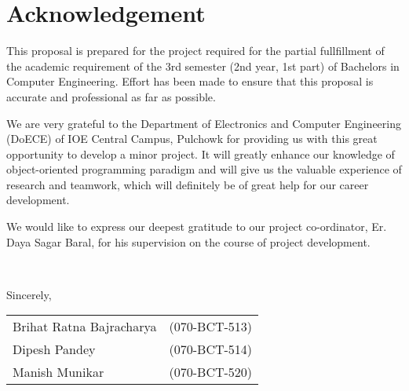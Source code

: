 \section*{Acknowledgement}

This proposal is prepared for the project required for the partial fullfillment
of the academic requirement of the 3rd semester (2nd year, 1st part) of
Bachelors in Computer Engineering. Effort has been made to ensure that this
proposal is accurate and professional as far as possible.

We are very grateful to the Department of Electronics and Computer Engineering
(DoECE) of IOE Central Campus, Pulchowk for providing us with this great
opportunity to develop a minor project. It will greatly enhance our knowledge
of object-oriented programming paradigm and will give us the valuable
experience of research and teamwork, which will definitely be of great help
for our career development.

We would like to express our deepest gratitude to our project co-ordinator,
Er. Daya Sagar Baral, for his supervision on the course of project
development.

~

Sincerely,\\
\begin{tabular}{ll}
    Brihat Ratna Bajracharya & (070-BCT-513)\\
    Dipesh Pandey & (070-BCT-514)\\
    Manish Munikar & (070-BCT-520)
\end{tabular}
